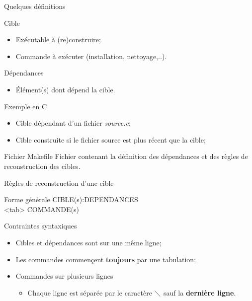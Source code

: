 \documentclass[10pt,xcolor=dvipsnames]{beamer}
\newcommand{\green}[1]{\textcolor{darkspringgreen}{#1}}
\begin{document}
\begin{frame}{Quelques définitions}
\begin{alertblock}{Cible}
    \begin{itemize}
        \item Exécutable à (re)construire;
        \item Commande à exécuter (installation, nettoyage,..).
    \end{itemize}
\end{alertblock}
\begin{alertblock}{Dépendances}
    \begin{itemize}
        \item Élément(s) dont dépend la cible.
    \end{itemize}
\end{alertblock}
\begin{exampleblock}{Exemple en C}
    \begin{itemize}
        \item Cible dépendant d'un fichier \textit{source.c};
        \item Cible construite si le fichier source est plus récent que la cible;
    \end{itemize}
\end{exampleblock}
    \begin{alertblock}{Fichier Makefile}
    Fichier contenant la définition des \alert{dépendances} et des règles de \alert{reconstruction} des cibles.
    \end{alertblock}
\end{frame}


\begin{frame}{Règles de reconstruction d'une cible}
\begin{exampleblock}{Forme générale}
CIBLE(s):DEPENDANCES\\
<tab> COMMANDE(s)
\end{exampleblock}

\begin{exampleblock}{Contraintes syntaxiques}
\begin{itemize}
    \item Cibles et dépendances sont sur une même ligne;
    \item Les commandes commençent \green{\bf{toujours}} par une tabulation;
    \item Commandes sur plusieurs lignes
    \begin{itemize}
        \item Chaque ligne est séparée par le caractère $\diagdown$ sauf la \green{\bf{dernière ligne}}.
        
    \end{itemize}
\end{itemize}
\end{exampleblock}
\end{frame}
\end{document}
